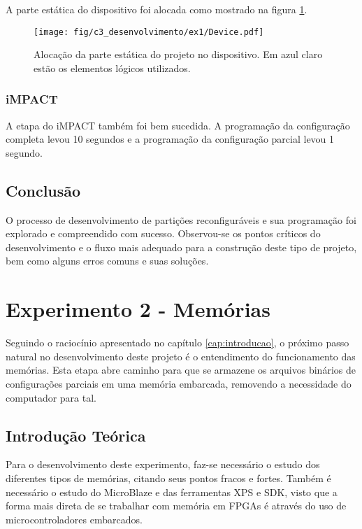 \documentclass[11pt,a4paper,oneside]{book}
\begin{document}
A parte estática do dispositivo foi alocada como mostrado na figura \ref{fig:ex1:device}.
\begin{figure}[h]
\centering
\texttt{[image: fig/c3\_desenvolvimento/ex1/Device.pdf]}
\caption{Alocação da parte estática do projeto no dispositivo. Em azul claro estão os elementos lógicos utilizados.}
\label{fig:ex1:device}
\end{figure}

\subsection{iMPACT}
A etapa do iMPACT também foi bem sucedida.
A programação da configuração completa levou 10 segundos e a programação da configuração parcial levou 1 segundo.

\section{Conclusão}
O processo de desenvolvimento de partições reconfiguráveis e sua programação foi explorado e compreendido com sucesso.
Observou-se os pontos críticos do desenvolvimento e o fluxo mais adequado para a construção deste tipo de projeto, bem como alguns erros comuns e suas soluções.


\chapter{Experimento 2 - Memórias}
Seguindo o raciocínio apresentado no capítulo \ref{cap:introducao}, o próximo passo natural no desenvolvimento deste projeto é o entendimento do funcionamento das memórias.
Esta etapa abre caminho para que se armazene os arquivos binários de configurações parciais em uma memória embarcada, removendo a necessidade do computador para tal.

\section{Introdução Teórica}
Para o desenvolvimento deste experimento, faz-se necessário o estudo dos diferentes tipos de memórias, citando seus pontos fracos e fortes.
Também é necessário o estudo do MicroBlaze e das ferramentas XPS e SDK, visto que a forma mais direta de se trabalhar com memória em FPGAs é através do uso de microcontroladores embarcados.
\end{document}
